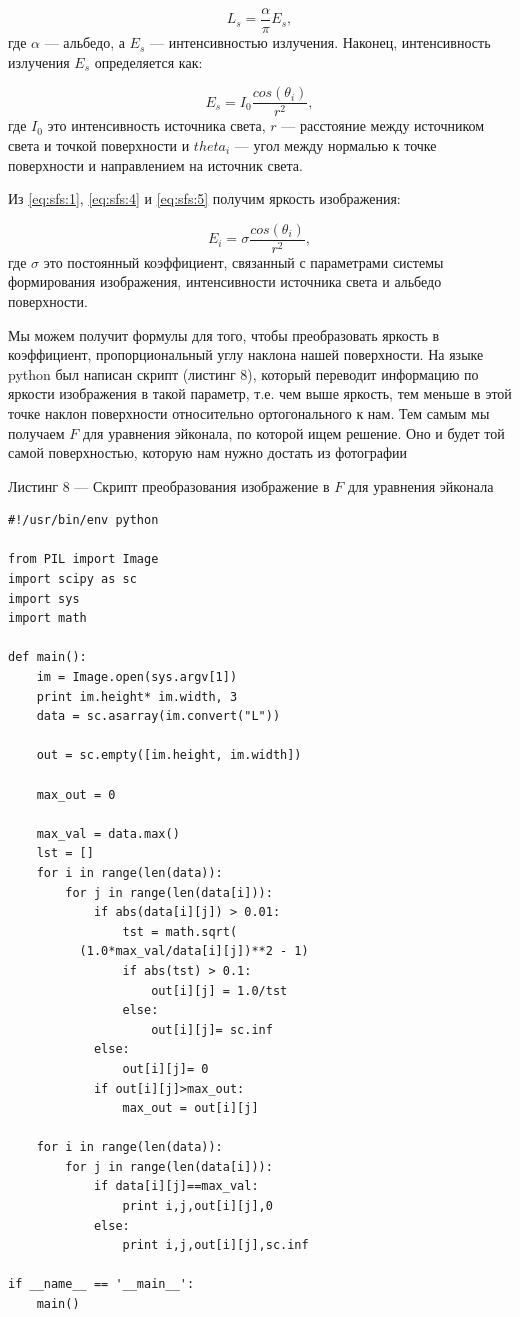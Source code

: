 \begin{equation}
  \label{eq:sfs:4}
  L_s=\frac{\alpha}{\pi}E_s,
\end{equation}
где $\alpha$ --- альбедо, а $E_s$ --- интенсивностью
излучения. Наконец, интенсивность излучения $E_s$ определяется как:

\begin{equation}
  \label{eq:sfs:5}
  E_s = I_0\frac{cos(\theta_i)}{r^2},
\end{equation}
где $I_0$ это интенсивность источника света, $r$ --- расстояние между
источником света и точкой поверхности и $theta_i$ --- угол между
нормалью к точке поверхности и направлением на источник света.

Из \eqref{eq:sfs:1}, \eqref{eq:sfs:4} и \eqref{eq:sfs:5} получим яркость
изображения:

\begin{equation}
  \label{eq:sfs:6}
  E_i = \sigma\frac{cos(\theta_i)}{r^2},
\end{equation}
где $\sigma$ это постоянный коэффициент, связанный с параметрами
системы формирования изображения, интенсивности источника света и
альбедо поверхности.

Мы можем получит формулы для того, чтобы преобразовать яркость в
коэффициент, пропорциональный углу наклона нашей поверхности.
На языке python был написан скрипт (листинг 8), который переводит информацию по
яркости изображения в такой параметр, т.е. чем выше
яркость, тем меньше в этой точке наклон поверхности относительно
ортогонального к нам. Тем самым мы получаем $F$ для уравнения
эйконала, по которой ищем решение. Оно и будет той самой поверхностью,
которую нам нужно достать из фотографии

\vspace{1em}
Листинг 8 --- Скрипт преобразования изображение в $F$ для уравнения эйконала
\normalsize
\begin{verbatim}
#!/usr/bin/env python

from PIL import Image
import scipy as sc
import sys
import math

def main():
    im = Image.open(sys.argv[1])
    print im.height* im.width, 3
    data = sc.asarray(im.convert("L"))

    out = sc.empty([im.height, im.width])

    max_out = 0
    
    max_val = data.max()
    lst = []
    for i in range(len(data)):
        for j in range(len(data[i])):
            if abs(data[i][j]) > 0.01:
                tst = math.sqrt(
          (1.0*max_val/data[i][j])**2 - 1)
                if abs(tst) > 0.1:
                    out[i][j] = 1.0/tst
                else:
                    out[i][j]= sc.inf
            else:
                out[i][j]= 0
            if out[i][j]>max_out:
                max_out = out[i][j]

    for i in range(len(data)):
        for j in range(len(data[i])):
            if data[i][j]==max_val:
                print i,j,out[i][j],0
            else:
                print i,j,out[i][j],sc.inf

if __name__ == '__main__':
    main()
\end{verbatim}
\large

